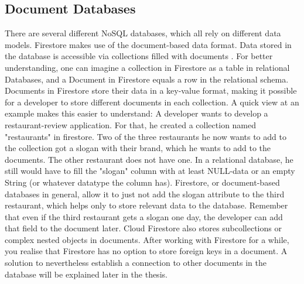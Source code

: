 \subsection{Document Databases}
There are several different NoSQL databases, which all rely on different data models. Firestore makes use of the document-based data format. Data stored in the database is accessible via collections filled with documents \cite{.firestore}. For better understanding, one can imagine a collection in Firestore as a table in relational Databases, and a Document in Firestore equals a row in the relational schema. Documents in Firestore store their data in a key-value format, making it possible for a developer to store different documents in each collection. A quick view at an example makes this easier to understand: A developer wants to develop a restaurant-review application. For that, he created a collection named "restaurants" in firestore. Two of the three restaurants he now wants to add to the collection got a slogan with their brand, which he wants to add to the documents. The other restaurant does not have one. In a relational database, he still would have to fill the "slogan" column with at least NULL-data or an empty String (or whatever datatype the column has). Firestore, or document-based databases in general, allow it to just not add the slogan attribute to the third restaurant, which helps only to store relevant data to the database. Remember that even if the third restaurant gets a slogan one day, the developer can add that field to the document later. Cloud Firestore also stores subcollections or complex nested objects in documents. After working with Firestore for a while, you realise that Firestore has no option to store foreign keys in a document. A solution to nevertheless establish a connection to other documents in the database will be explained later in the thesis.